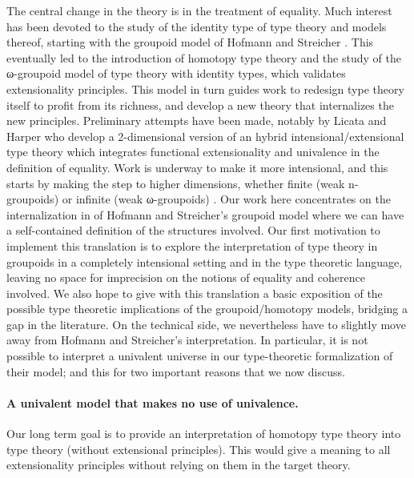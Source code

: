 The central change in the theory is in the treatment of equality.  Much
interest has been devoted to the study of the identity type of type
theory and models thereof, starting with the groupoid model of Hofmann
and Streicher \cite{groupoid-interp}. This eventually led to the
introduction of homotopy type theory and the study of the ω-groupoid
model of type theory with identity types, which validates extensionality
principles.
This model in turn
guides work to redesign type theory itself to profit from its
richness, and develop a new theory that internalizes the new
principles. Preliminary attempts have been made, notably by Licata and
Harper \cite{DBLP:conf/popl/LicataH12} who develop a 2-dimensional
version of an hybrid intensional/extensional type theory which
integrates functional extensionality and univalence in the definition
of equality. Work is underway to make it more intensional, and this
starts by making the step to higher dimensions, whether finite (weak
n-groupoids) or infinite (weak ω-groupoids)
\cite{DBLP:conf/csl/AltenkirchR12}. %
%
Our work here concentrates on the internalization in \Coq of Hofmann and
Streicher's groupoid model where we can have a self-contained definition
of the structures involved.
%
Our first motivation to implement this translation is to explore the
interpretation of type theory in groupoids in a completely
intensional setting and in the type theoretic language, leaving no space
for imprecision on the notions of equality and coherence involved.  We
also hope to give with this translation a basic exposition of the
possible type theoretic implications of the groupoid/homotopy models,
bridging a gap in the literature. 
%
On the technical side, we nevertheless have to slightly move away from
Hofmann and Streicher's interpretation.  In particular, it is not
possible to interpret a univalent universe in our type-theoretic
formalization of their model; and this for two important reasons that we
now discuss.


\paragraph{\bf A univalent model that makes no use of univalence.}


Our long term goal is to provide an interpretation of homotopy type
theory into type theory (without extensional principles).
%
This would give a meaning to all extensionality
principles without relying on them in the target theory.

